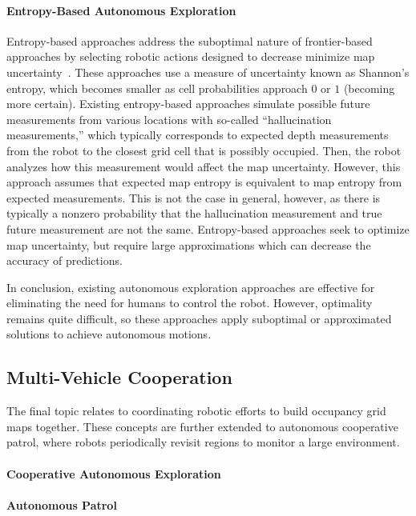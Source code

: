 \documentclass[thesis]{thesis-gwu}
\begin{document}
\paragraph{Entropy-Based Autonomous Exploration}
Entropy-based approaches address the suboptimal nature of frontier-based approaches by selecting robotic actions designed to decrease minimize map uncertainty~\cite{StaGriBur05,BurMooStaSch05}. These approaches use a measure of uncertainty known as Shannon's entropy, which becomes smaller as cell probabilities approach $0$ or $1$ (becoming more certain). Existing entropy-based approaches simulate possible future measurements from various locations with so-called ``hallucination measurements,'' which typically corresponds to expected depth measurements from the robot to the closest grid cell that is possibly occupied. Then, the robot analyzes how this measurement would affect the map uncertainty. However, this approach assumes that expected map entropy is equivalent to map entropy from expected measurements. This is not the case in general, however, as there is typically a nonzero probability that the hallucination measurement and true future measurement are not the same. Entropy-based approaches seek to optimize map uncertainty, but require large approximations which can decrease the accuracy of predictions.

In conclusion, existing autonomous exploration approaches are effective for eliminating the need for humans to control the robot. However, optimality remains quite difficult, so these approaches apply suboptimal or approximated solutions to achieve autonomous motions.


\subsection{Multi-Vehicle Cooperation}

The final topic relates to coordinating robotic efforts to build occupancy grid maps together. These concepts are further extended to autonomous cooperative patrol, where robots periodically revisit regions to monitor a large environment.

\paragraph{Cooperative Autonomous Exploration}



\paragraph{Autonomous Patrol}
\end{document}
